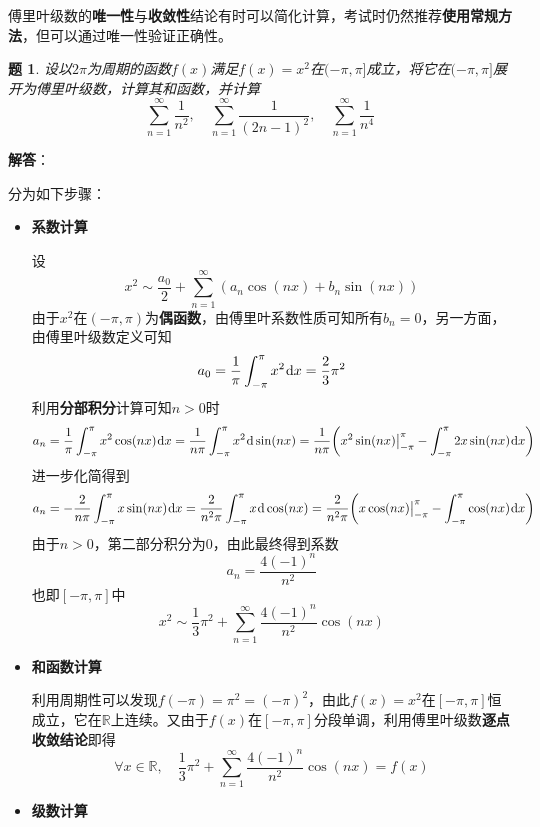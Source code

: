 \documentclass[a4paper,UTF8,fontset=windows,AutoFakeBold]{ctexart}
\newcommand*{\dr}{\hspace{0.07em}\mathrm{d}}
\newcommand*{\rb}{\mathbb{R}}
\newcommand*{\suminf}[1][n=1]{\sum_{#1}^\infty}
\newcommand*{\note}{\noindent *}
\theoremstyle{ex}
\newtheorem{exercise}{题}
\newcommand{\sol}[1]{{\vspace{5pt}\kaishu\noindent\textbf{解答}：\vspace{-3pt}
\begin{compactitem}
    \item[] #1
\end{compactitem}
}}
\begin{document}
\note 傅里叶级数的\textbf{唯一性}与\textbf{收敛性}结论有时可以简化计算，考试时仍然推荐\textbf{使用常规方法}，但可以通过唯一性验证正确性。

\begin{framed}
\begin{exercise}\label{fourier n4}
    设以$2\pi$为周期的函数$f(x)$满足$f(x)=x^2$在$(-\pi,\pi]$成立，将它在$(-\pi,\pi]$展开为傅里叶级数，计算其和函数，并计算
    $$\suminf\frac{1}{n^2},\quad\suminf\frac{1}{(2n-1)^2},\quad\suminf\frac{1}{n^4}$$
\end{exercise}
\sol{
    分为如下步骤：
    \begin{itemize}
        \item \textbf{系数计算}
        
        设
        $$x^2\sim\frac{a_0}{2}+\suminf(a_n\cos(nx)+b_n\sin(nx))$$
        由于$x^2$在$(-\pi,\pi)$为\textbf{偶函数}，由傅里叶系数性质可知所有$b_n=0$，另一方面，由傅里叶级数定义可知
        $$a_0=\frac{1}{\pi}\int_{-\pi}^\pi x^2\dr x=\frac{2}{3}\pi^2$$
        利用\textbf{分部积分}计算可知$n>0$时
        $$a_n=\frac{1}{\pi}\int_{-\pi}^\pi x^2\cos(nx)\dr x=\frac{1}{n\pi}\int_{-\pi}^\pi x^2\dr\sin(nx)=\frac{1}{n\pi}\bigg(x^2\sin(nx)\big|^\pi_{-\pi}-\int_{-\pi}^\pi2x\sin(nx)\dr x\bigg)$$
        进一步化简得到
        $$a_n=-\frac{2}{n\pi}\int_{-\pi}^\pi x\sin(nx)\dr x=\frac{2}{n^2\pi}\int_{-\pi}^\pi x\dr\cos(nx)=\frac{2}{n^2\pi}\bigg(x\cos(nx)\big|^\pi_{-\pi}-\int_{-\pi}^\pi\cos(nx)\dr x\bigg)$$
        由于$n>0$，第二部分积分为0，由此最终得到系数
        $$a_n=\frac{4(-1)^n}{n^2}$$
        也即$[-\pi,\pi]$中
        $$x^2\sim\frac{1}{3}\pi^2+\suminf\frac{4(-1)^n}{n^2}\cos(nx)$$

        \item \textbf{和函数计算}
        
        利用周期性可以发现$f(-\pi)=\pi^2=(-\pi)^2$，由此$f(x)=x^2$在$[-\pi,\pi]$恒成立，它在$\rb$上连续。又由于$f(x)$在$[-\pi,\pi]$分段单调，利用傅里叶级数\textbf{逐点收敛结论}即得
        $$\forall x\in\rb,\quad\frac{1}{3}\pi^2+\suminf\frac{4(-1)^n}{n^2}\cos(nx)=f(x)$$
        
        \item \textbf{级数计算}
        

\end{itemize}}
\end{framed}
\end{document}
